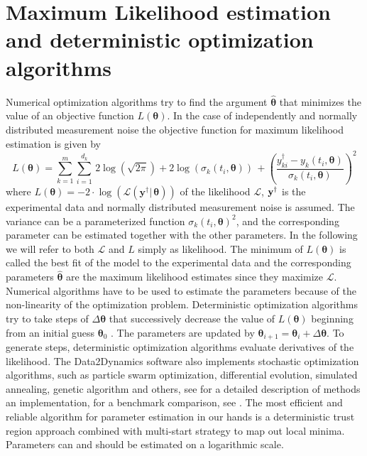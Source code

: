 \documentclass[12pt,a4paper]{scrartcl}
\begin{document}
\section{Maximum Likelihood estimation and deterministic optimization 
algorithms} \label{sec:det_optimization}
Numerical optimization algorithms try to find the argument $\boldsymbol{\hat \theta}$ that 
minimizes the value of an objective function $L(\boldsymbol{\theta})$. In the case of 
independently and normally distributed measurement noise the objective function for 
maximum likelihood estimation is given by
\begin{equation}
	L(\boldsymbol{\theta}) = \sum_{k=1}^m \sum_{i=1}^{d_k}\, 2\log(\sqrt{2 \pi}) + 
2\log(\sigma_k(t_i, \boldsymbol{\theta}))\, + \left(\frac{y_{ki}^\dagger - y_{k}(t_{i}, 
\boldsymbol{\theta})}{\sigma_k(t_i, \boldsymbol{\theta})}\right)^2 \label{llhoodfun2}
\end{equation}
where $L(\boldsymbol{\theta}) =  - 2\cdot \log(\mathcal{L}(\mathbf{y}^\dagger|\,
\boldsymbol{\theta}))$ of the likelihood $\mathcal{L}$, ${\bf y}^\dagger$ is the experimental 
data and normally distributed measurement noise is assumed. The variance can be a 
parameterized function $\sigma_k(t_i, \boldsymbol{\theta})^2$, and the corresponding 
parameter can be estimated together with the other parameters. In the following we will 
refer to both $\mathcal{L}$ and $L$ simply as likelihood. The minimum of 
$L(\boldsymbol{\theta})$ is called the best fit of the model to the experimental data and the 
corresponding parameters $\boldsymbol{\hat \theta}$ are the maximum likelihood 
estimates since they maximize $\mathcal{L}$. Numerical algorithms have to be used to 
estimate the parameters because of the non-linearity of the optimization problem. 
Deterministic optimization algorithms try to take steps of $\Delta \boldsymbol{\theta}$ that 
successively decrease the value of $L(\boldsymbol{\theta})$ beginning from an initial 
guess $\boldsymbol{\theta}_0$ \citep{Press:1990rw}. The parameters are updated by $
\boldsymbol{\theta}_{i+1} = \boldsymbol{\theta}_{i} + \Delta \boldsymbol{\theta}$. To 
generate steps, deterministic optimization algorithms evaluate derivatives of the likelihood. 
The Data2Dynamics software also implements stochastic optimization algorithms, such as
 particle swarm optimization, differential evolution, simulated annealing, genetic algorithm 
 and others, see \citet{Kronfeld:2010fk} for a detailed description of methods an 
 implementation, for a benchmark comparison, see \citet{Raue:2012zt}. The most efficient 
 and reliable algorithm for parameter estimation in our hands is a deterministic trust region 
 approach combined with multi-start strategy to map out local minima. Parameters can and 
 should be estimated on a logarithmic scale.
\end{document}
